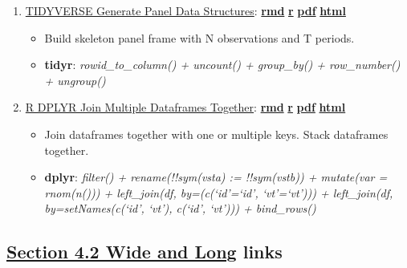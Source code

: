 \documentclass[
]{book}
\providecommand{\tightlist}{%
  \setlength{\itemsep}{0pt}\setlength{\parskip}{0pt}}
\begin{document}
\begin{enumerate}
\def\labelenumi{\arabic{enumi}.}
\tightlist
\item
  \href{https://fanwangecon.github.io/R4Econ/panel/basic/htmlpdfr/fs_genpanel.html}{TIDYVERSE Generate Panel Data Structures}: \href{https://github.com/FanWangEcon/R4Econ/blob/master/panel/basic//fs_genpanel.Rmd}{\textbf{rmd}} \textbar{} \href{https://github.com/FanWangEcon/R4Econ/blob/master/panel/basic/htmlpdfr/fs_genpanel.R}{\textbf{r}} \textbar{} \href{https://github.com/FanWangEcon/R4Econ/blob/master/panel/basic/htmlpdfr/fs_genpanel.pdf}{\textbf{pdf}} \textbar{} \href{https://fanwangecon.github.io/R4Econ/panel/basic/htmlpdfr/fs_genpanel.html}{\textbf{html}}

  \begin{itemize}
  \tightlist
  \item
    Build skeleton panel frame with N observations and T periods.
  \item
    \textbf{tidyr}: \emph{rowid\_to\_column() + uncount() + group\_by() + row\_number() + ungroup()}
  \end{itemize}
\item
  \href{https://fanwangecon.github.io/R4Econ/panel/basic/htmlpdfr/fs_joining.html}{R DPLYR Join Multiple Dataframes Together}: \href{https://github.com/FanWangEcon/R4Econ/blob/master/panel/basic//fs_joining.Rmd}{\textbf{rmd}} \textbar{} \href{https://github.com/FanWangEcon/R4Econ/blob/master/panel/basic/htmlpdfr/fs_joining.R}{\textbf{r}} \textbar{} \href{https://github.com/FanWangEcon/R4Econ/blob/master/panel/basic/htmlpdfr/fs_joining.pdf}{\textbf{pdf}} \textbar{} \href{https://fanwangecon.github.io/R4Econ/panel/basic/htmlpdfr/fs_joining.html}{\textbf{html}}

  \begin{itemize}
  \tightlist
  \item
    Join dataframes together with one or multiple keys. Stack dataframes together.
  \item
    \textbf{dplyr}: \emph{filter() + rename(!!sym(vsta) := !!sym(vstb)) + mutate(var = rnom(n())) + left\_join(df, by=(c(`id'=`id', `vt'=`vt'))) + left\_join(df, by=setNames(c(`id', `vt'), c(`id', `vt'))) + bind\_rows()}
  \end{itemize}
\end{enumerate}

\hypertarget{section-4.2-wide-and-longwide-and-long-links}{%
\subsection{\texorpdfstring{\protect\hyperlink{wide-and-long}{Section 4.2 Wide and Long} links}{Section 4.2 Wide and Long links}}\label{section-4.2-wide-and-longwide-and-long-links}}
\end{document}
